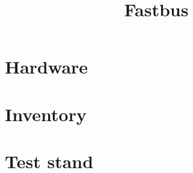 \documentclass {article}
\title{Fastbus}
\begin{document}
\section{Hardware}

\section{Inventory}

\section{Test stand}
\end{document}
